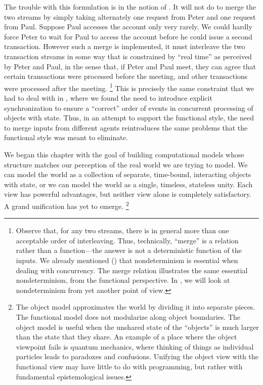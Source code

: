The trouble with this formulation is in the notion of .
It will not do to merge the two streams by simply taking alternately one request from Peter and one request from Paul.
Suppose Paul accesses the account only very rarely.
We could hardly force Peter to wait for Paul to access the account before he could issue a second transaction.
However such a merge is implemented, it must interleave the two transaction streams in some way that is constrained by “real time” as perceived by Peter and Paul, in the sense that, if Peter and Paul meet, they can agree that certain transactions were processed before the meeting, and other transactions were processed after the meeting.%
\footnote{
	Observe that, for any two streams, there is in general more than one acceptable order of interleaving.
	Thus, technically, “merge” is a relation rather than a function---the answer is not a deterministic function of the inputs.
	We already mentioned () that nondeterminism is essential when dealing with concurrency.
	The merge relation illustrates the same essential nondeterminism, from the functional perspective.
	In , we will look at nondeterminism from yet another point of view.
}
This is precisely the same constraint that we had to deal with in , where we found the need to introduce explicit synchronization to ensure a “correct” order of events in concurrent processing of objects with state.
Thus, in an attempt to support the functional style, the need to merge inputs from different agents reintroduces the same problems that the functional style was meant to eliminate.

We began this chapter with the goal of building computational models whose structure matches our perception of the real world we are trying to model.
We can model the world as a collection of separate, time-bound, interacting objects with state, or we can model the world as a single, timeless, stateless unity.
Each view has powerful advantages, but neither view alone is completely satisfactory.
A grand unification has yet to emerge.%
\footnote{
	The object model approximates the world by dividing it into separate pieces.
	The functional model does not modularize along object boundaries.
	The object model is useful when the unshared state of the “objects” is much larger than the state that they share.
	An example of a place where the object viewpoint fails is quantum mechanics, where thinking of things as individual particles leads to paradoxes and confusions.
	Unifying the object view with the functional view may have little to do with programming, but rather with fundamental epistemological issues.
}
